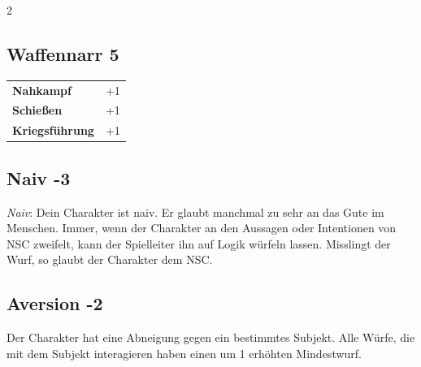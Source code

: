 \begin{multicols}{2}
\begin{tcolorbox}
\end{tcolorbox}

\begin{tcolorbox}
    \subsection*{Waffennarr \hfill \small{5 }}
    \tcblower




\begin{tabular}{@{}ll@{}}
    \textbf{Nahkampf} & +1\\
    \textbf{Schießen} & +1\\
    \textbf{Kriegsführung} & +1\\
\end{tabular}


\end{tcolorbox}

\begin{tcolorbox}
    \subsection*{Naiv \hfill \small{-3 }}
    \tcblower
\textit{Naiv}: Dein Charakter ist naiv. Er glaubt manchmal zu sehr an das Gute im Menschen. Immer, wenn der Charakter an den Aussagen oder Intentionen von NSC zweifelt, kann der Spielleiter ihn auf Logik würfeln lassen. Misslingt der Wurf, so glaubt der Charakter dem NSC.


\vspace{3mm}



\end{tcolorbox}

\begin{tcolorbox}
    \subsection*{Aversion \hfill \small{-2 }}
    \tcblower
Der Charakter hat eine Abneigung gegen ein bestimmtes Subjekt. Alle Würfe, die mit dem Subjekt interagieren haben einen um 1 erhöhten Mindestwurf.



\end{tcolorbox}
\end{multicols}
